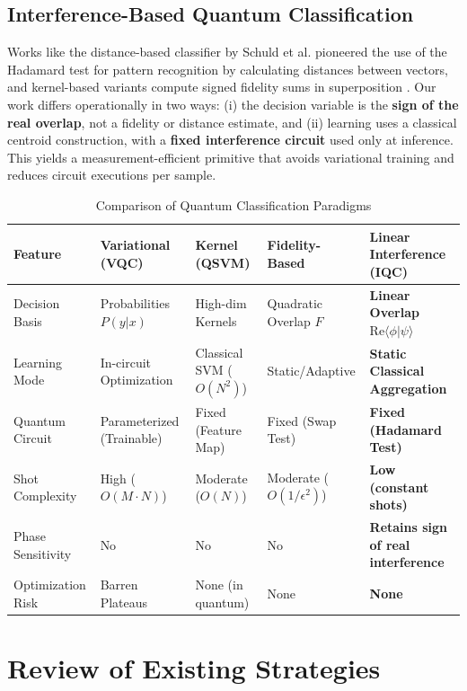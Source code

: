 \documentclass[conference]{IEEEtran}
\begin{document}
\subsection{Interference-Based Quantum Classification}

Works like the distance-based classifier by Schuld et al. \cite{schuld2017distance,schuld2018book} pioneered the use of the Hadamard test for pattern recognition by calculating distances between vectors, and kernel-based variants compute signed fidelity sums in superposition \cite{blank2020kernel,blank2022compact}. Our work differs operationally in two ways: (i) the decision variable is the \textbf{sign of the real overlap}, not a fidelity or distance estimate, and (ii) learning uses a classical centroid construction, with a \textbf{fixed interference circuit} used only at inference. This yields a measurement-efficient primitive that avoids variational training and reduces circuit executions per sample.

\begin{table}[t]
\centering
\caption{Comparison of Quantum Classification Paradigms}
\label{tab:comparison}
\begin{tabular}{@{}lllll@{}}
\toprule
Feature & Variational (VQC) & Kernel (QSVM) & Fidelity-Based & \textbf{Linear Interference (IQC)} \\ \midrule
Decision Basis & Probabilities $P(y|x)$ & High-dim Kernels & Quadratic Overlap $F$ & \textbf{Linear Overlap $\mathrm{Re}\langle \phi|\psi \rangle$} \\
Learning Mode & In-circuit Optimization & Classical SVM ($O(N^2)$) & Static/Adaptive & \textbf{Static Classical Aggregation} \\
Quantum Circuit & Parameterized (Trainable) & Fixed (Feature Map) & Fixed (Swap Test) & \textbf{Fixed (Hadamard Test)} \\
Shot Complexity & High ($O(M \cdot N)$) & Moderate ($O(N)$) & Moderate ($O(1/\epsilon^2)$) & \textbf{Low (constant shots)} \\
Phase Sensitivity & No & No & No & \textbf{Retains sign of real interference} \\
Optimization Risk & Barren Plateaus & None (in quantum) & None & \textbf{None} \\ \bottomrule
\end{tabular}
\end{table}

\section{Review of Existing Strategies}
\end{document}
